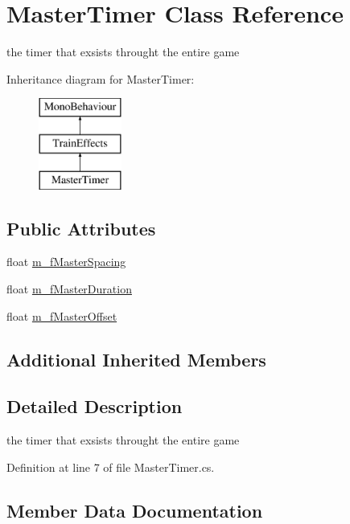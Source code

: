 \hypertarget{class_master_timer}{}\section{Master\+Timer Class Reference}
\label{class_master_timer}


the timer that exsists throught the entire game  


Inheritance diagram for Master\+Timer\+:\begin{figure}[H]
\begin{center}
\leavevmode
\includegraphics[height=3.000000cm]{class_master_timer}
\end{center}
\end{figure}
\subsection*{Public Attributes}
\begin{DoxyCompactItemize}
\item 
float \mbox{\hyperlink{class_master_timer_a5bc844dfb40680ddffc9986ad6d4a32c}{m\+\_\+f\+Master\+Spacing}}
\item 
float \mbox{\hyperlink{class_master_timer_a403ee9898919b07a54d6891505c2afb8}{m\+\_\+f\+Master\+Duration}}
\item 
float \mbox{\hyperlink{class_master_timer_a318b40ad59086995734f0d8ee789ac76}{m\+\_\+f\+Master\+Offset}}
\end{DoxyCompactItemize}
\subsection*{Additional Inherited Members}


\subsection{Detailed Description}
the timer that exsists throught the entire game 



Definition at line 7 of file Master\+Timer.\+cs.



\subsection{Member Data Documentation}
\mbox{\label{class_master_timer_a403ee9898919b07a54d6891505c2afb8}} 
